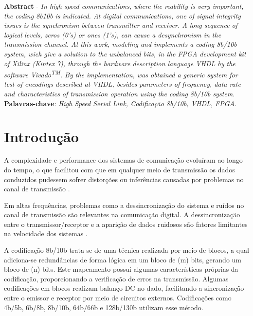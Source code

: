 \documentclass[11pt,twocolumn]{article}
\begin{document}
\thispagestyle{empty}

\noindent\textbf{Abstract} - \textit{ In high speed communications, where the reability is very important, the coding 8b10b is indicated. At digital communications, one of signal integrity issues is the synchronism between transmitter and receiver. A long sequence of logical levels, zeros (0's) or ones (1's), can cause a desynchronism in the transmission channel. At this work, modeling and implements a coding 8b/10b system, wich give a solution to the unbalanced 	bits, in the FPGA development kit of Xilinx (Kintex 7), through the hardware description language VHDL by the software Vivado\textsuperscript{TM}. By the implementation, was obtained a generic system for test of encodings described at VHDL, besides parameters of frequency, data rate and characteristics of transmission operation using the coding 8b/10b system}. 
\newline \textbf{Palavras-chave}: \textit{High Speed Serial Link, Codificação 8b/10b, VHDL, FPGA}.

\section{Introdução}

A complexidade e performance dos sistemas de comunicação evoluíram ao longo do tempo, o que facilitou com que em qualquer meio de transmissão os dados conduzidos pudessem sofrer distorções ou inferências causadas por problemas no canal de transmissão \cite{Borges}. 

Em altas frequências, problemas como a dessincronização do sistema e ruídos no canal de transmissão são relevantes na comunicação digital. A dessincronização entre o transmissor/receptor e a aparição de dados ruidosos são fatores limitantes na velocidade dos sistemas \cite{pra}. 

A codificação 8b/10b trata-se de uma técnica realizada por meio de blocos, a qual adiciona-se redundâncias de forma lógica em um bloco de (m) bits, gerando um bloco de (n) bits. Este mapeamento possui algumas características próprias da codificação, proporcionando a verificação de erros na transmissão. Algumas codificações em blocos realizam balanço DC no dado, facilitando a sincronização entre o emissor e receptor por meio de circuitos externos. Codificações como 4b/5b, 6b/8b, 8b/10b, 64b/66b e 128b/130b utilizam esse método\cite{Fourouzan}.
\end{document}
